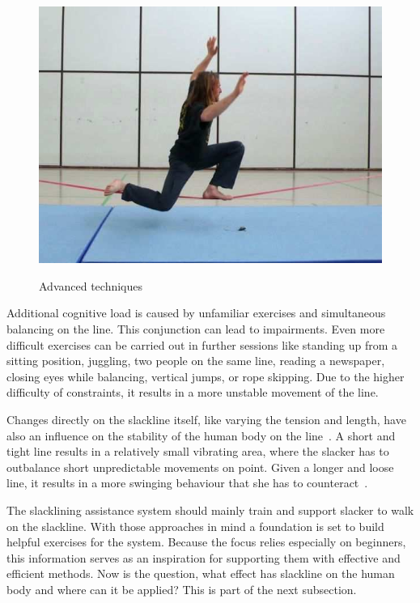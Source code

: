 \begin{figure}[htb]
\begin{minipage}[t]{0.3\linewidth}
		\label{fig:slacklineAdvancedHandsBehindBack}
	\end{minipage}	
	\hfill
	\begin{minipage}[t]{0.38\linewidth}
		\centering
		\includegraphics[width=1\linewidth]{Pictures/slacklineAdvancedDropknee}
		\label{fig:slacklineAdvancedDropknee}
	\end{minipage}	
	\caption{Advanced techniques~\cite{Kroiss2007-ab}}
	\label{fig:advancedExercises}
\end{figure}

Additional cognitive load is caused by unfamiliar exercises and simultaneous balancing on the line. This conjunction can lead to impairments. Even more difficult exercises can be carried out in further sessions like standing up from a sitting position, juggling, two people on the same line, reading a newspaper, closing eyes while balancing, vertical jumps, or rope skipping. Due to the higher difficulty of constraints, it results in a more unstable movement of the line.

Changes directly on the slackline itself, like varying the tension and length, have also an influence on the stability of the human body on the line~\cite{Keller2012-xh, Pfusterschmied2013-yy, Pfusterschmied2013-kq}. A short and tight line results in a relatively small vibrating area, where the slacker has to outbalance short unpredictable movements on point. Given a longer and loose line, it results in a more swinging behaviour that she has to counteract~\cite{Kroiss2007-ab}.
 
The slacklining assistance system should mainly train and support slacker to walk on the slackline. With those approaches in mind a foundation is set to build helpful exercises for the system. Because the focus relies especially on beginners, this information serves as an inspiration for supporting them with effective and efficient methods. Now is the question, what effect has slackline on the human body and where can it be applied? This is part of the next subsection.

